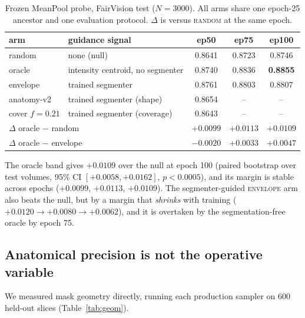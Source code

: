 \documentclass{article}
\begin{document}
\begin{table}[t]
\centering
\caption{Frozen MeanPool probe, FairVision test ($N{=}3000$). All arms share one
epoch-25 ancestor and one evaluation protocol. $\Delta$ is versus \textsc{random}
at the same epoch.}
\label{tab:main}
\small
\begin{tabular}{llccc}
\toprule
arm & guidance signal & ep50 & ep75 & ep100 \\
\midrule
random      & none (null)                & 0.8641 & 0.8723 & 0.8746 \\
oracle      & intensity centroid, no segmenter & 0.8740 & 0.8836 & \textbf{0.8855} \\
envelope    & trained segmenter          & 0.8761 & 0.8803 & 0.8807 \\
anatomy-v2  & trained segmenter (shape)  & 0.8654 & --     & --     \\
cover $f{=}0.21$ & trained segmenter (coverage) & 0.8643 & -- & -- \\
\midrule
\multicolumn{2}{l}{$\Delta$ oracle $-$ random} & $+0.0099$ & $+0.0113$ & $+0.0109$ \\
\multicolumn{2}{l}{$\Delta$ oracle $-$ envelope} & $-0.0020$ & $+0.0033$ & $+0.0047$ \\
\bottomrule
\end{tabular}
\end{table}

The oracle band gives $+0.0109$ over the null at epoch 100 (paired bootstrap
over test volumes, 95\% CI $[+0.0058,+0.0162]$, $p<0.0005$), and its margin is
stable across epochs ($+0.0099$, $+0.0113$, $+0.0109$). The segmenter-guided
\textsc{envelope} arm also beats the null, but by a margin that \emph{shrinks}
with training ($+0.0120 \to +0.0080 \to +0.0062$), and it is overtaken by the
segmentation-free oracle by epoch 75.

\subsection{Anatomical precision is not the operative variable}

We measured mask geometry directly, running each production sampler on 600
held-out slices (Table~\ref{tab:geom}).
\end{document}
